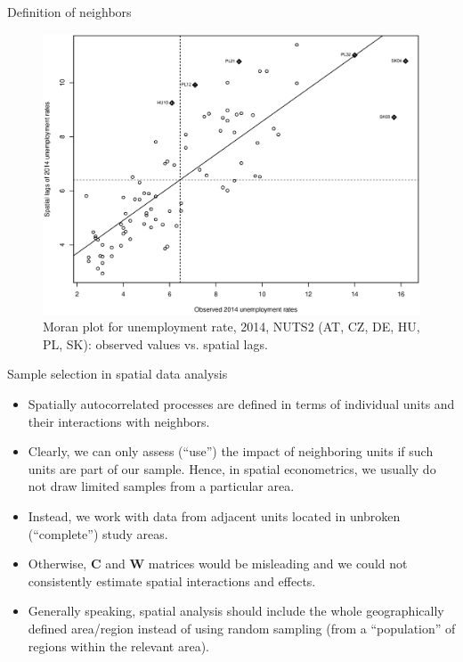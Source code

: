 \documentclass{beamer}
\begin{document}
\begin{frame}{Definition of neighbors}
\vspace{-0.3cm}
\begin{figure}
	\includegraphics[width=.7\textwidth]{IMG/sp_MoranPlot.eps}
	\caption[]{Moran plot for unemployment rate, 2014, NUTS2 (AT, CZ, DE, HU, PL, SK): observed values vs. spatial lags.}
\end{figure}
\end{frame}
\begin{frame}{Sample selection in spatial data analysis}
\begin{itemize}
    \item Spatially autocorrelated processes are defined in terms of individual units and their interactions with neighbors. 
    \smallskip
    \item Clearly, we can only assess (``use'') the impact of neighboring units if such units are part of our sample. Hence, in spatial econometrics, we usually do not draw limited samples from a particular area.
    \smallskip
    \item Instead, we work with data from adjacent units located in unbroken (``complete'') study areas.  
    \smallskip
    \item Otherwise, $\bm{C}$ and $\bm{W}$ matrices would be misleading and we could not consistently estimate spatial interactions and effects.
    \smallskip    
    \item Generally speaking, spatial analysis should include the whole geographically defined area/region instead of using random sampling (from a ``population'' of regions within the relevant area). 
\end{itemize}
\end{frame}
\end{document}
